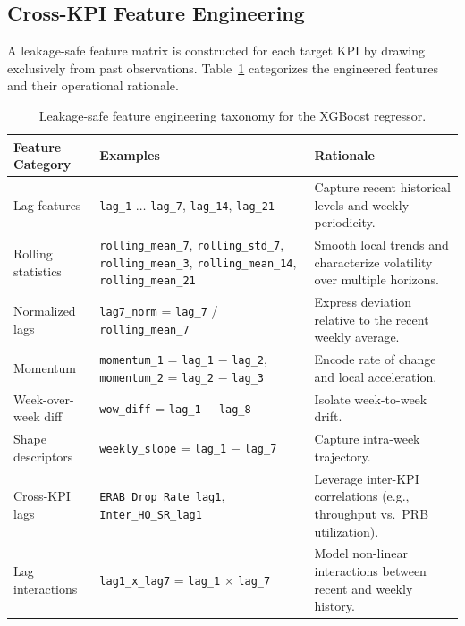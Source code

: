 \subsection{Cross-KPI Feature Engineering}

A leakage-safe feature matrix is constructed for each target KPI by drawing exclusively from past observations. Table~\ref{tab:features} categorizes the engineered features and their operational rationale.

\begin{table}[htbp]
    \centering
    \caption{Leakage-safe feature engineering taxonomy for the XGBoost regressor.}
    \label{tab:features}
    \begin{tabular}{@{}p{3.2cm}p{4.8cm}p{5.5cm}@{}}
        \toprule
        \textbf{Feature Category} & \textbf{Examples} & \textbf{Rationale} \\
        \midrule
        Lag features & \texttt{lag\_1} $\ldots$ \texttt{lag\_7}, \texttt{lag\_14}, \texttt{lag\_21} & Capture recent historical levels and weekly periodicity. \\
        Rolling statistics & \texttt{rolling\_mean\_7}, \texttt{rolling\_std\_7}, \texttt{rolling\_mean\_3}, \texttt{rolling\_mean\_14}, \texttt{rolling\_mean\_21} & Smooth local trends and characterize volatility over multiple horizons. \\
        Normalized lags & \texttt{lag7\_norm} = \texttt{lag\_7} / \texttt{rolling\_mean\_7} & Express deviation relative to the recent weekly average. \\
        Momentum & \texttt{momentum\_1} = \texttt{lag\_1} $-$ \texttt{lag\_2}, \texttt{momentum\_2} = \texttt{lag\_2} $-$ \texttt{lag\_3} & Encode rate of change and local acceleration. \\
        Week-over-week diff & \texttt{wow\_diff} = \texttt{lag\_1} $-$ \texttt{lag\_8} & Isolate week-to-week drift. \\
        Shape descriptors & \texttt{weekly\_slope} = \texttt{lag\_1} $-$ \texttt{lag\_7} & Capture intra-week trajectory. \\
        Cross-KPI lags & \texttt{ERAB\_Drop\_Rate\_lag1}, \texttt{Inter\_HO\_SR\_lag1} & Leverage inter-KPI correlations (e.g., throughput vs.~PRB utilization). \\
        Lag interactions & \texttt{lag1\_x\_lag7} = \texttt{lag\_1} $\times$ \texttt{lag\_7} & Model non-linear interactions between recent and weekly history. \\
        \bottomrule
    \end{tabular}
\end{table}

